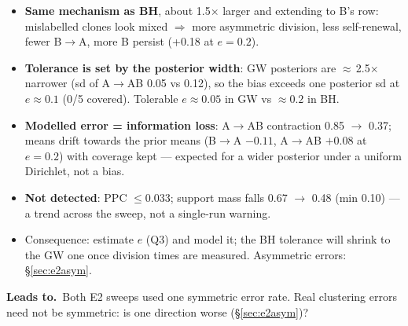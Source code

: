 \documentclass[10pt,a4paper]{article}
\newcommand{\blk}[1]{\par\needspace{5\baselineskip}\smallskip{\sffamily\bfseries\color{inkgray}#1}\par}
\newcommand{\Comment}{\blk{Comment}}
\newcommand{\Leads}[1]{\begin{leadbox}{\sffamily\bfseries\color{caqua!70!black}Leads to.}\ #1\end{leadbox}}
\renewcommand{\blk}[1]{\par\Needspace*{5\baselineskip}\smallskip{\sffamily\bfseries\color{inkgray}#1}\par}
\newcommand{\sref}[1]{\S\ref{#1}}
\begin{document}
\Comment
\begin{itemize}
\item \textbf{Same mechanism as BH}, about 1.5$\times$ larger and extending to B's row: mislabelled clones look mixed $\Rightarrow$ more asymmetric division, less self-renewal, fewer B$\to$A, more B persist (+0.18 at $e=0.2$).
\item \textbf{Tolerance is set by the posterior width}: GW posteriors are $\approx$\,2.5$\times$ narrower (sd of A$\to$AB 0.05 vs 0.12), so the bias exceeds one posterior sd at $e \approx 0.1$ (0/5 covered). Tolerable $e \approx 0.05$ in GW vs $\approx 0.2$ in BH.
\item \textbf{Modelled error = information loss}: A$\to$AB contraction 0.85 $\to$ 0.37; means drift towards the prior means (B$\to$A $-0.11$, A$\to$AB $+0.08$ at $e=0.2$) with coverage kept --- expected for a wider posterior under a uniform Dirichlet, not a bias.
\item \textbf{Not detected}: PPC $\le 0.033$; support mass falls 0.67 $\to$ 0.48 (min 0.10) --- a trend across the sweep, not a single-run warning.
\item Consequence: estimate $e$ (Q3) and model it; the BH tolerance will shrink to the GW one once division times are measured. Asymmetric errors: \S\ref{sec:e2asym}.
\end{itemize}
\Leads{Both E2 sweeps used one symmetric error rate. Real clustering errors need not be symmetric: is one direction worse (\sref{sec:e2asym})?}
\end{document}

